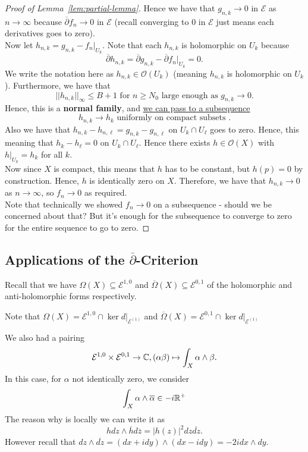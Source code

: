 \documentclass{article}
\begin{document}
{\begin{proof}[Proof of Lemma~\ref{lem:partial-lemma}]
Hence we have that $g_{n, k} \to 0$ in $\mathcal{E}$ as $n \to \infty$ because $\overline{\partial} f_n \to 0$ in $\mathcal{E}$ (recall converging to $0$ in $\mathcal{E}$ just means each derivatives goes to zero).\\

Now let $h_{n, k} = g_{n, k} - f_n|_{U_k}$. Note that each $h_{n, k}$ is holomorphic on $U_k$ because
\[\overline{\partial} h_{n, k} = \overline{\partial} g_{n, k} - \overline{\partial} f_n|_{U_k} = 0.\]
We write the notation here as $h_{n, k} \in \mathcal{O}(U_k)$ (meaning $h_{n, k}$ is holomorphic on $U_k$). Furthermore, we have that
\[||h_{n, k}||_{\infty} \leq B + 1 \text{ for } n \geq N_0 \text{ large enough as $g_{n, k} \to 0$}.\]
Hence, this is a \textbf{normal family}, and \underline{we can pass to a subsequence}
\[h_{n, k} \to h_k \text{ uniformly on compact subsets }.\]
Also we have that $h_{n, k} - h_{n, \ell} = g_{n, k} - g_{n, \ell}$ on $U_k \cap U_\ell$ goes to zero. Hence, this meaning that $h_k - h_\ell = 0$ on $U_k \cap U_\ell$. Hence there exists $h \in \mathcal{O}(X)$ with $h|_{U_k} = h_k$ for all $k$.\\

Now since $X$ is compact, this means that $h$ has to be constant, but $h(p) = 0$ by construction. Hence, $h$ is identically zero on $X$. Therefore, we have that $h_{n, k} \to 0$ as $n \to \infty$, so $f_n \to 0$ as required.\\

Note that technically we showed $f_n \to 0$ on a subsequence - should we be concerned about that? But it's enough for the subsequence to converge to zero for the entire sequence to go to zero.
\end{proof}

\subsection{Applications of the $\overline{\partial}$-Criterion}

Recall that we have $\Omega(X) \subseteq \mathcal{E}^{1, 0}$ and $\overline{\Omega}(X) \subseteq \mathcal{E}^{0, 1}$ of the holomorphic and anti-holomorphic forms respectively. 
\begin{remark}
    Note that $\Omega(X) = \mathcal{E}^{1, 0} \cap \ker d|_{\mathcal{E}^{(1)}}$ and $\overline{\Omega}(X) = \mathcal{E}^{0, 1} \cap \ker d|_{\mathcal{E}^{(1)}}$
\end{remark}


We also had a pairing
\[\mathcal{E}^{1, 0} \times \mathcal{E}^{0, 1} \to \mathbb{C}, (\alpha \beta) \mapsto \int_{X} \alpha \wedge \beta.\]
In this case, for $\alpha$ not identically zero, we consider
\[\int_{X} \alpha \wedge \overline{\alpha} \in -i \mathbb{R}^{+}\]
The reason why is locally we can write it as
\[h dz \wedge \overline{h} d\overline{z} = |h(z)|^2 dz \overline{dz}.\]
However recall that $dz \wedge \overline{dz} = (dx + idy) \wedge (dx - idy) = -2i dx \wedge dy$.\\

}
\end{document}
